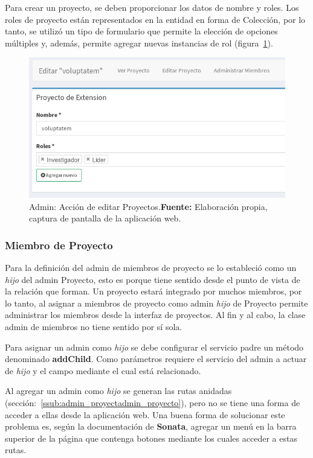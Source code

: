 Para crear un proyecto, se deben proporcionar los datos de nombre y roles. Los roles de proyecto están representados en la entidad en forma de Colección,
por lo tanto, se utilizó un tipo de formulario que permite la elección de opciones múltiples y, además, permite agregar nuevas instancias de
rol (figura~\ref{fig:image/proyecto-editar}).

\begin{figure}[h]
    \includegraphics[width=1\linewidth]{image/edit-proyecto.png}
    \caption{Admin: Acción de  editar Proyectos.\newline \textbf{Fuente:} Elaboración propia, captura de pantalla de la aplicación web.}
    \label{fig:image/proyecto-editar}
\end{figure}

\subsubsection{Miembro de Proyecto}%
\label{ssub:miembro_de_proyecto_admin}
Para la definición del admin de miembros de proyecto se lo estableció como un \textit{hijo} del admin Proyecto, esto es porque tiene sentido desde el punto
de vista de la relación que forman. Un proyecto estará integrado por muchos miembros, por lo tanto, al asignar a miembros de proyecto como admin \textit{hijo}
de Proyecto permite administrar los miembros desde la interfaz de proyectos. Al fin y al cabo, la clase admin de miembros no tiene sentido por sí sola.

Para asignar un admin como \textit{hijo} se debe configurar el servicio padre un método denominado \textbf{addChild}. Como parámetros requiere el servicio
del admin a actuar de \textit{hijo} y el campo mediante el cual está relacionado.


Al agregar un admin como \textit{hijo} se generan las rutas anidadas (sección:~\ref{ssub:admin_proyectadmin_proyecto}), pero no se tiene una forma de acceder a
ellas desde la aplicación web\@. Una buena forma de solucionar este problema es, según la documentación de \textbf{Sonata}, agregar un menú en la barra superior
de la página que contenga botones mediante los cuales acceder a estas rutas.\parencite{sonata-childAdmin}

